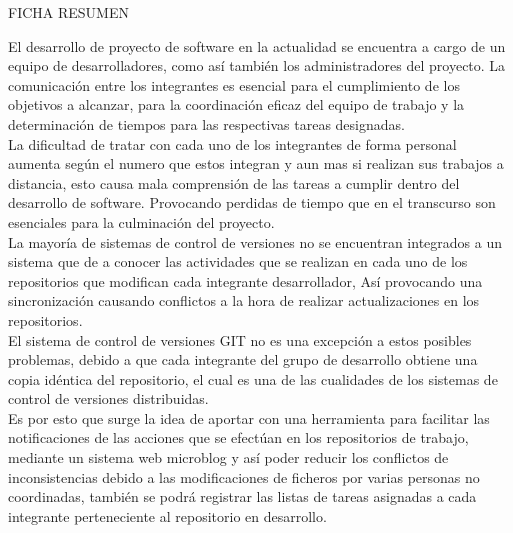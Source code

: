 \begin{center}
 {\Large FICHA RESUMEN}\\
\end{center}

El desarrollo de proyecto de software en la actualidad se encuentra a cargo de un equipo de desarrolladores, como así también los administradores del proyecto.
La comunicación entre los integrantes es esencial para el cumplimiento de los objetivos a alcanzar, para la coordinación eficaz del equipo de trabajo y la determinación de tiempos para las respectivas tareas designadas.\\

La dificultad de tratar con cada uno de los integrantes de forma personal aumenta según el numero que estos integran y aun mas si realizan sus trabajos a distancia, esto causa mala comprensión de las tareas a cumplir dentro del desarrollo de software. Provocando perdidas de tiempo que en el transcurso son esenciales para la culminación del proyecto.\\

La mayoría de sistemas de control de versiones no se encuentran integrados a un sistema que de a conocer las actividades que se realizan en cada uno de los repositorios que modifican cada integrante desarrollador, Así provocando una sincronización causando conflictos a la hora de realizar actualizaciones en los repositorios.\\
El sistema de control de versiones GIT no es una excepción a estos posibles problemas, debido a que cada integrante del grupo de desarrollo obtiene una copia idéntica del repositorio, el cual es una de las cualidades de los sistemas de control de versiones distribuidas.\\

Es por esto que surge la idea de aportar con una herramienta para facilitar las notificaciones de las acciones que se efectúan en los repositorios de trabajo, mediante un sistema web microblog y así poder reducir los conflictos de inconsistencias debido a las modificaciones de ficheros por varias personas no coordinadas, también se podrá registrar las listas de tareas asignadas a cada integrante 
perteneciente al repositorio en desarrollo.